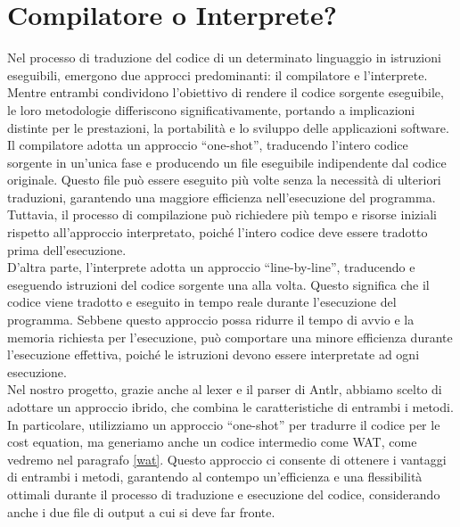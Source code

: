 \documentclass[../../main.tex]{subfiles}
\begin{document}
\section{Compilatore o Interprete?}
Nel processo di traduzione del codice di un determinato linguaggio in istruzioni eseguibili, emergono due approcci predominanti: il compilatore e l'interprete. Mentre entrambi condividono l'obiettivo di rendere il codice sorgente eseguibile, le loro metodologie differiscono significativamente, portando a implicazioni distinte per le prestazioni, la portabilità e lo sviluppo delle applicazioni software.\\
Il compilatore adotta un approccio ``one-shot'', traducendo l'intero codice sorgente in un'unica fase e producendo un file eseguibile indipendente dal codice originale. Questo file può essere eseguito più volte senza la necessità di ulteriori traduzioni, garantendo una maggiore efficienza nell'esecuzione del programma. Tuttavia, il processo di compilazione può richiedere più tempo e risorse iniziali rispetto all'approccio interpretato, poiché l'intero codice deve essere tradotto prima dell'esecuzione.\\
D'altra parte, l'interprete adotta un approccio ``line-by-line'', traducendo e eseguendo istruzioni del codice sorgente una alla volta. Questo significa che il codice viene tradotto e eseguito in tempo reale durante l'esecuzione del programma. Sebbene questo approccio possa ridurre il tempo di avvio e la memoria richiesta per l'esecuzione, può comportare una minore efficienza durante l'esecuzione effettiva, poiché le istruzioni devono essere interpretate ad ogni esecuzione.\\
Nel nostro progetto, grazie anche al lexer e il parser di Antlr, abbiamo scelto di adottare un approccio ibrido, che combina le caratteristiche di entrambi i metodi. In particolare, utilizziamo un approccio ``one-shot'' per tradurre il codice per le cost equation, ma generiamo anche un codice intermedio come WAT, come vedremo nel paragrafo \ref{wat}. 
Questo approccio ci consente di ottenere i vantaggi di entrambi i metodi, garantendo al contempo un'efficienza e una flessibilità ottimali durante il processo di traduzione e esecuzione del codice, considerando anche i due file di output a cui si deve far fronte.
\autocite{DBLP:books/aw/AhoSU86}
\end{document}
